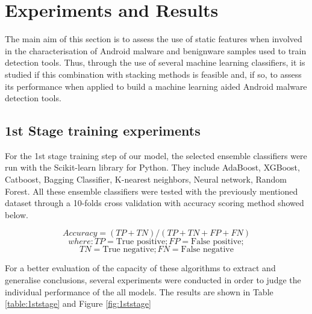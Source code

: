 \chapter{Experiments and Results}
The main aim of this section is to assess the use of static features when involved in the characterisation of Android malware and benignware samples used to train detection tools. Thus, through
the use of several machine learning classifiers, it is studied if this combination with stacking methods is feasible and, if
so, to assess its performance when applied to build a machine learning aided Android malware
detection tools.

\section{1st Stage training experiments} \label{1ststagetrain}

For the 1st stage training step of our model, the selected ensemble classifiers were run with the Scikit-learn library for Python\cite{scikitlearn}.
They include AdaBoost, XGBoost, Catboost, Bagging Classifier, K-nearest neighbors, Neural network, Random Forest. 
All these ensemble classifiers were tested with the previously mentioned dataset through a 10-folds cross validation with accuracy scoring method showed below.

$$Accuracy = (TP+TN)/(TP+TN+FP+FN)$$
$$where: TP = \text{True positive}; FP = \text{False positive};$$$$TN = \text{True negative}; FN = \text{False negative}$$

For a better evaluation of the capacity of these algorithms to extract
and generalise conclusions, several experiments were conducted in order to judge the individual performance of the all models.
The results are shown in Table \ref{table:1ststage} and Figure \ref{fig:1ststage}

